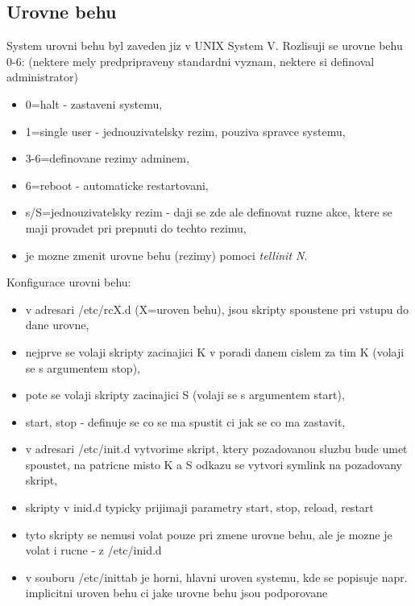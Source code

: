 \documentclass[a4paper, 11pt]{article}
\begin{document}
\subsection{Urovne behu}
System urovni behu byl zaveden jiz v UNIX System V. Rozlisuji se urovne behu 0-6: (nektere mely predpripraveny standardni vyznam, nektere si definoval administrator)
\begin{itemize}
    \item 0=halt - zastaveni systemu,
    \item 1=single user - jednouzivatelsky rezim, pouziva spravce systemu,
    \item 3-6=definovane rezimy adminem,
    \item 6=reboot - automaticke restartovani,
    \item s/S=jednouzivatelsky rezim - daji se zde ale definovat ruzne akce, ktere se maji provadet pri prepnuti do techto rezimu,
    \item je mozne zmenit urovne behu (rezimy) pomoci \textit{tellinit N}. \\
\end{itemize}

Konfigurace urovni behu:
\begin{itemize}
    \item v adresari /etc/rcX.d (X=uroven behu), jsou skripty spoustene pri vstupu do dane urovne,
    \item nejprve se volaji skripty zacinajici K v poradi danem cislem za tim K (volaji se s argumentem stop),
    \item pote se volaji skripty zacinajici S (volaji se s argumentem start),
    \item start, stop - definuje se co se ma spustit ci jak se co ma zastavit,
    \item v adresari /etc/init.d vytvorime skript, ktery pozadovanou sluzbu bude umet spoustet, na patricne misto K a S odkazu se vytvori symlink na pozadovany skript,
    \item skripty v inid.d typicky prijimaji parametry start, stop, reload, restart
    \item tyto skripty se nemusi volat pouze pri zmene urovne behu, ale je mozne je volat i rucne - z /etc/inid.d
    \item v souboru /etc/inittab je horni, hlavni uroven systemu, kde se popisuje napr. implicitni uroven behu ci jake urovne behu jsou podporovane \\
\end{itemize}
\end{document}
